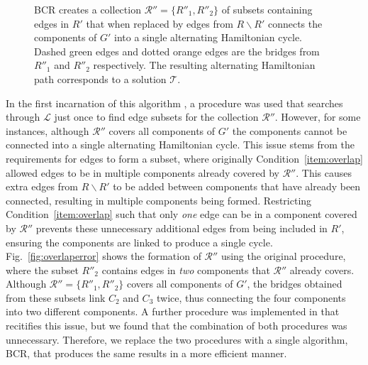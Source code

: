 \documentclass{IEEEtran}
\begin{document}
\begin{figure}[h]	
	\centering
	\subfloat[]{
	\label{fig:bcrlist}}
	\hspace{5mm}
	\subfloat[]{
	\label{fig:mpsconnect}}
	\hspace{5mm}
	\subfloat[]{
	\label{fig:mpscycle}}
	\hspace{3mm}
	\subfloat[]{
	\label{fig:solutionpath}}
	\caption{BCR creates a collection $\mathcal{R}'' = \{R''_1, R''_2\}$ of subsets containing edges in $R'$ that when replaced by edges from $R\backslash R'$ connects the components of $G'$ into a single alternating Hamiltonian cycle. Dashed green edges and dotted orange edges are the bridges from $R''_1$ and $R''_2$ respectively. The resulting alternating Hamiltonian path corresponds to a solution $\mathcal{T}$.}
	\label{fig:bcr}
\end{figure}

In the first incarnation of this algorithm \cite{becker2010}, a procedure was used that searches through $\mathcal{L}$ just once to find edge subsets for the collection $\mathcal{R}''$. However, for some instances, although $\mathcal{R}''$ covers all components of $G'$ the components cannot be connected into a single alternating Hamiltonian cycle. This issue stems from the requirements for edges to form a subset, where originally Condition~\ref{item:overlap} allowed edges to be in multiple components already covered by $\mathcal{R}''$. This causes extra edges from $R \backslash R'$ to be added between components that have already been connected, resulting in multiple components being formed. Restricting Condition~\ref{item:overlap} such that only \emph{one} edge can be in a component covered by $\mathcal{R}''$ prevents these unnecessary additional edges from being included in $R'$, ensuring the components are linked to produce a single cycle. Fig.~\ref{fig:overlaperror} shows the formation of $\mathcal{R}''$ using the original procedure, where the subset $R''_2$ contains edges in \emph{two} components that $\mathcal{R}''$ already covers. Although $\mathcal{R}'' = \{R''_1, R''_2\}$ covers all components of $G'$, the bridges obtained from these subsets link $C_2$ and $C_3$ twice, thus connecting the four components into two different components. A further procedure was implemented in \cite{hawa2018} that recitifies this issue, but we found that the combination of both procedures was unnecessary. Therefore, we replace the two procedures with a single algorithm, BCR, that produces the same results in a more efficient manner.
\end{document}
